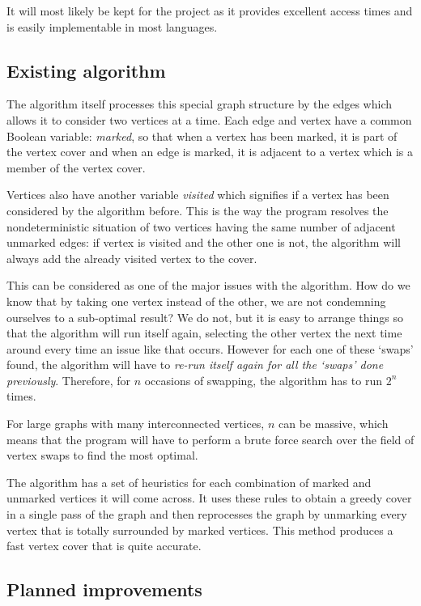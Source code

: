 \documentclass[11pt]{article}
\theoremstyle{definition}
\begin{document}
      It will most likely be kept for the project as it provides excellent access times and is easily implementable in
      most languages. 

    \subsection{Existing algorithm}
      The algorithm itself processes this special graph structure by the edges which allows it to consider two vertices at
      a time. Each edge and vertex have a common Boolean variable: \emph{marked}, so that
      when a vertex has been marked, it is part of the vertex cover and when an edge is marked, it is adjacent to a vertex
      which is a member of the vertex cover.

      Vertices also have another variable \emph{visited} which signifies if a vertex has been considered by
      the algorithm before. This is the way the program resolves the nondeterministic situation of two
      vertices having the same number of adjacent
      unmarked edges: if vertex is visited and the other one is not, the algorithm will always add the already visited vertex
      to the cover.

      This can be considered as one of the major issues with the algorithm. How do we know that by taking one vertex instead
      of the other, we are not condemning ourselves to a sub-optimal result? We do not, but it is easy to
      arrange things so that the algorithm
      will run itself again, selecting the other vertex the next time around every time an issue like that occurs. However for
      each one of these `swaps' found, the algorithm will have to 
      \emph{re-run itself again for all the `swaps' done previously}. Therefore, for $n$ occasions of swapping, the
      algorithm has to run $2^n$ times.

      For large graphs with many interconnected vertices, $n$ can be massive, which means
      that the program will have to perform a brute force search over the field of vertex swaps to find the most optimal. 

      The algorithm has a set of heuristics for each combination of marked and unmarked vertices it will
      come across. It uses these rules to obtain a greedy cover in a single pass of the graph and then reprocesses
      the graph by unmarking every vertex that is totally surrounded by marked vertices. This method produces a fast
      vertex cover that is quite accurate. 

    \subsection{Planned improvements}   \label{PI}
      
\end{document}
